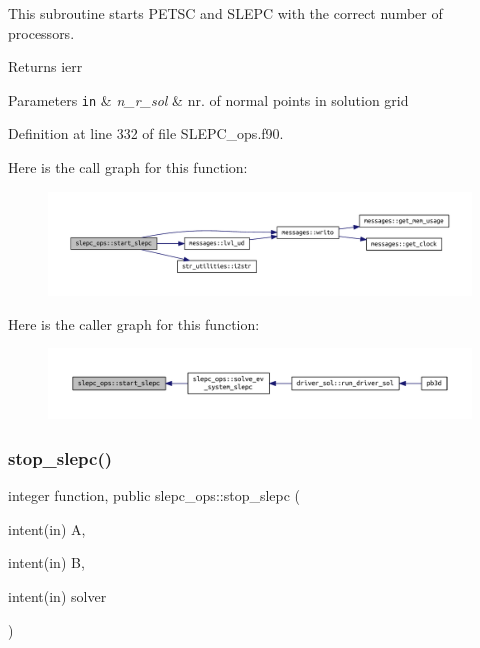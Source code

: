 This subroutine starts P\+E\+T\+SC and S\+L\+E\+PC with the correct number of processors. 

\begin{DoxyReturn}{Returns}
ierr
\end{DoxyReturn}

\begin{DoxyParams}[1]{Parameters}
\mbox{\tt in}  & {\em n\+\_\+r\+\_\+sol} & nr. of normal points in solution grid \\
\hline
\end{DoxyParams}


Definition at line 332 of file S\+L\+E\+P\+C\+\_\+ops.\+f90.

Here is the call graph for this function\+:\nopagebreak
\begin{figure}[H]
\begin{center}
\leavevmode
\includegraphics[width=350pt]{namespaceslepc__ops_a9cec5d9e8abc41d0d7ffb14352112040_cgraph}
\end{center}
\end{figure}
Here is the caller graph for this function\+:\nopagebreak
\begin{figure}[H]
\begin{center}
\leavevmode
\includegraphics[width=350pt]{namespaceslepc__ops_a9cec5d9e8abc41d0d7ffb14352112040_icgraph}
\end{center}
\end{figure}
\mbox{\label{namespaceslepc__ops_aeeac6908b3988f395314e7769829a058}} 
\subsubsection{\texorpdfstring{stop\+\_\+slepc()}{stop\_slepc()}}
{\footnotesize\ttfamily integer function, public slepc\+\_\+ops\+::stop\+\_\+slepc (\begin{DoxyParamCaption}\item[{intent(in)}]{A,  }\item[{intent(in)}]{B,  }\item[{intent(in)}]{solver }\end{DoxyParamCaption})}



